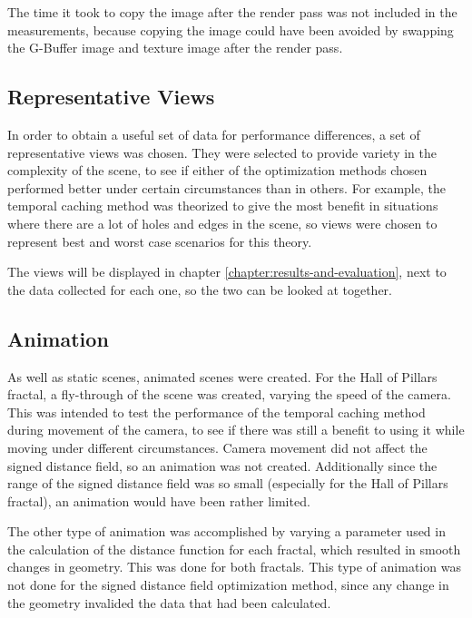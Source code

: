 The time it took to copy the image after the render pass was not included in the measurements, because copying the image could have been avoided by swapping the G-Buffer image and texture image after the render pass.

\subsection{Representative Views}

In order to obtain a useful set of data for performance differences, a set of representative views was chosen. They were selected to provide variety in the complexity of the scene, to see if either of the optimization methods chosen performed better under certain circumstances than in others. For example, the temporal caching method was theorized to give the most benefit in situations where there are a lot of holes and edges in the scene, so views were chosen to represent best and worst case scenarios for this theory.\newline

The views will be displayed in chapter \ref{chapter:results-and-evaluation}, next to the data collected for each one, so the two can be looked at together.

\subsection{Animation}

As well as static scenes, animated scenes were created. For the Hall of Pillars fractal, a fly-through of the scene was created, varying the speed of the camera. This was intended to test the performance of the temporal caching method during movement of the camera, to see if there was still a benefit to using it while moving under different circumstances. Camera movement did not affect the signed distance field, so an animation was not created. Additionally since the range of the signed distance field was so small (especially for the Hall of Pillars fractal), an animation would have been rather limited.\newline

The other type of animation was accomplished by varying a parameter used in the calculation of the distance function for each fractal, which resulted in smooth changes in geometry. This was done for both fractals. This type of animation was not done for the signed distance field optimization method, since any change in the geometry invalided the data that had been calculated.

